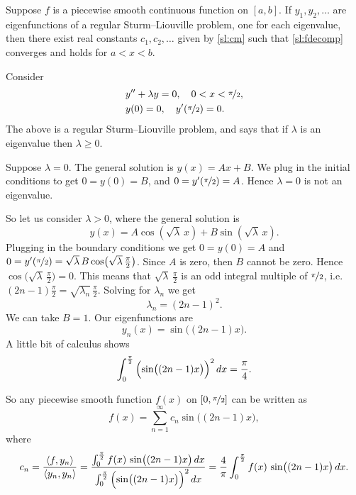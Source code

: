 \begin{theorem}
Suppose $f$ is a piecewise smooth continuous function on $[a,b]$.  If $y_1,
y_2, \ldots$ are eigenfunctions of a regular Sturm--Liouville problem,
one for each eigenvalue,
then there exist real constants $c_1, c_2, \ldots$ given by \eqref{sl:cm}
such that
\eqref{sl:fdecomp} converges and holds for $a < x < b$.
\end{theorem}

\begin{example}
Consider
\begin{align*}
& y'' + \lambda y = 0, \quad 0 < x < \nicefrac{\pi}{2} , \\
& y(0) =0, \quad y'(\nicefrac{\pi}{2}) = 0 .
\end{align*}
The above is a regular Sturm--Liouville problem, and
says that if $\lambda$ is an eigenvalue then
$\lambda \geq 0$.

Suppose $\lambda = 0$.  The general solution is $y(x) = Ax + B$.
We plug in the
initial conditions to get $0=y(0) = B$, and $0 = y'(\nicefrac{\pi}{2}) = A$.
Hence $\lambda = 0$ is not an eigenvalue.

So let us consider $\lambda > 0$, where
the general solution is
\begin{equation*}
y(x) = A \cos ( \sqrt{\lambda} \, x ) + B \sin ( \sqrt{\lambda} \, x) .
\end{equation*}
Plugging in the boundary conditions we get
$0 = y(0) = A$ and $0 = y'(\nicefrac{\pi}{2})
= \sqrt{\lambda} \, B \cos \bigl(\sqrt{\lambda} \, \frac{\pi}{2}\bigr)$.
Since $A$ is zero, then
$B$ cannot be zero.  Hence $\cos \bigl( \sqrt{\lambda} \,
\frac{\pi}{2}\bigr) = 0$.
This means that
$\sqrt{\lambda} \,\frac{\pi}{2}$ is an odd integral multiple of
$\nicefrac{\pi}{2}$,
i.e.\ $(2n-1)\frac{\pi}{2} = \sqrt{\lambda_n} \,\frac{\pi}{2}$.
Solving for $\lambda_n$ we get
\begin{equation*}
\lambda_n = {(2n-1)}^2 .
\end{equation*}
We can take $B = 1$.  Our eigenfunctions are
\begin{equation*}
y_n(x) = \sin \bigl( (2n-1)x \bigr) .
\end{equation*}
A little bit of calculus shows
\begin{equation*}
\int_0^{\frac{\pi}{2}} {\Bigl( \sin \bigl( (2n-1)x \bigr) \Bigr)}^2 \, dx
= \frac{\pi}{4} .
\end{equation*}

So any piecewise smooth function $f(x)$ on $[0,\nicefrac{\pi}{2}]$ can be written as
\begin{equation*}
f(x) = \sum_{n=1}^\infty c_n \sin \bigl( (2n-1)x \bigr) ,
\end{equation*}
where
\begin{equation*}
c_n = \frac{\langle f , y_n \rangle}{\langle y_n , y_n \rangle}
= \frac{\int_0^{\frac{\pi}{2}} f(x) \, \sin \bigl( (2n-1)x \bigr) \, dx
}{\int_0^{\frac{\pi}{2}} {\Bigl(\sin \bigl((2n-1)x\bigr)\Bigr)}^2 \, dx}
= \frac{4}{\pi} \int_0^{\frac{\pi}{2}} f(x) \,\sin \bigl( (2n-1)x \bigr) \, dx .
\end{equation*}


\end{example}
